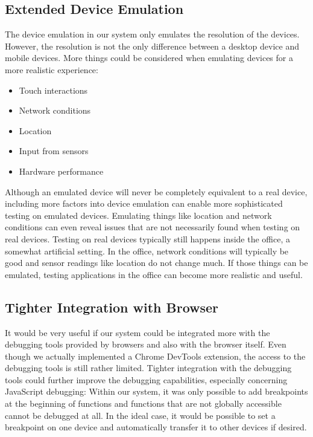 \subsection{Extended Device Emulation}

The device emulation in our system only emulates the resolution of the devices. However, the resolution is not the only difference between a desktop device and mobile devices. More things could be considered when emulating devices for a more realistic experience:
\begin{itemize}
	\item Touch interactions
	\item Network conditions
	\item Location
	\item Input from sensors
	\item Hardware performance
\end{itemize}
Although an emulated device will never be completely equivalent to a real device, including more factors into device emulation can enable more sophisticated testing on emulated devices. Emulating things like location and network conditions can even reveal issues that are not necessarily found when testing on real devices. Testing on real devices typically still happens inside the office, a somewhat artificial setting. In the office, network conditions will typically be good and sensor readings like location do not change much. If those things can be emulated, testing applications in the office can become more realistic and useful.

\subsection{Tighter Integration with Browser}

It would be very useful if our system could be integrated more with the debugging tools provided by browsers and also with the browser itself. Even though we actually implemented a Chrome DevTools extension, the access to the debugging tools is still rather limited. Tighter integration with the debugging tools could further improve the debugging capabilities, especially concerning JavaScript debugging: Within our system, it was only possible to add breakpoints at the beginning of functions and functions that are not globally accessible cannot be debugged at all. In the ideal case, it would be possible to set a breakpoint on one device and automatically transfer it to other devices if desired. 

